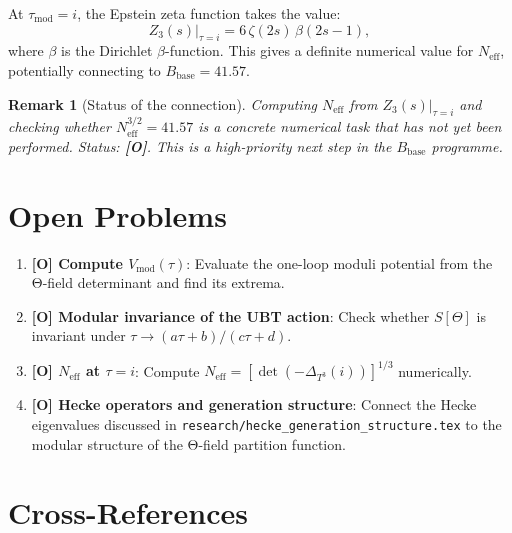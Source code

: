\documentclass[11pt,a4paper]{article}
\newtheorem{remark}{Remark}
\begin{document}
At $\tau_{\mathrm{mod}} = i$, the Epstein zeta function takes the value:
\begin{equation}
  Z_3(s)|_{\tau=i} = 6\,\zeta(2s)\,\beta(2s-1),
\end{equation}
where $\beta$ is the Dirichlet $\beta$-function.  This gives a definite
numerical value for $N_{\mathrm{eff}}$, potentially connecting to
$B_{\mathrm{base}} = 41.57$.

\begin{remark}[Status of the connection]
  Computing $N_{\mathrm{eff}}$ from $Z_3(s)|_{\tau=i}$ and checking
  whether $N_{\mathrm{eff}}^{3/2} = 41.57$ is a concrete numerical task
  that has not yet been performed.  Status: \textbf{[O]}.
  This is a high-priority next step in the $B_{\mathrm{base}}$ programme.
\end{remark}

\section{Open Problems}
\label{sec:open}

\begin{enumerate}
  \item \textbf{[O] Compute $V_{\mathrm{mod}}(\tau)$}: Evaluate the one-loop
    moduli potential from the Θ-field determinant and find its extrema.

  \item \textbf{[O] Modular invariance of the UBT action}: Check whether
    $S[\Theta]$ is invariant under $\tau \to (a\tau+b)/(c\tau+d)$.

  \item \textbf{[O] $N_{\mathrm{eff}}$ at $\tau = i$}: Compute
    $N_{\mathrm{eff}} = [\det(-\Delta_{T^3}(i))]^{1/3}$ numerically.

  \item \textbf{[O] Hecke operators and generation structure}: Connect
    the Hecke eigenvalues discussed in
    \texttt{research/hecke\_generation\_structure.tex} to the modular
    structure of the Θ-field partition function.
\end{enumerate}

\section{Cross-References}
\label{sec:xref}
\end{document}
